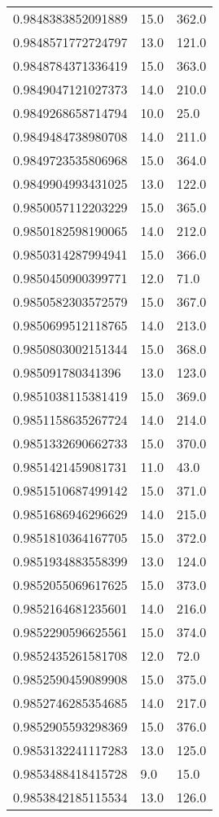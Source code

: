 \begin{center}
\begin{supertabular}[H]{p{0.30\textwidth}p{0.05\textwidth}p{0.05\textwidth}}
0.9848383852091889 & 15.0 & 362.0 \\ 
0.9848571772724797 & 13.0 & 121.0 \\ 
0.9848784371336419 & 15.0 & 363.0 \\ 
0.9849047121027373 & 14.0 & 210.0 \\ 
0.9849268658714794 & 10.0 & 25.0 \\ 
0.9849484738980708 & 14.0 & 211.0 \\ 
0.9849723535806968 & 15.0 & 364.0 \\ 
0.9849904993431025 & 13.0 & 122.0 \\ 
0.9850057112203229 & 15.0 & 365.0 \\ 
0.9850182598190065 & 14.0 & 212.0 \\ 
0.9850314287994941 & 15.0 & 366.0 \\ 
0.9850450900399771 & 12.0 & 71.0 \\ 
0.9850582303572579 & 15.0 & 367.0 \\ 
0.9850699512118765 & 14.0 & 213.0 \\ 
0.9850803002151344 & 15.0 & 368.0 \\ 
0.985091780341396 & 13.0 & 123.0 \\ 
0.9851038115381419 & 15.0 & 369.0 \\ 
0.9851158635267724 & 14.0 & 214.0 \\ 
0.9851332690662733 & 15.0 & 370.0 \\ 
0.9851421459081731 & 11.0 & 43.0 \\ 
0.9851510687499142 & 15.0 & 371.0 \\ 
0.9851686946296629 & 14.0 & 215.0 \\ 
0.9851810364167705 & 15.0 & 372.0 \\ 
0.9851934883558399 & 13.0 & 124.0 \\ 
0.9852055069617625 & 15.0 & 373.0 \\ 
0.9852164681235601 & 14.0 & 216.0 \\ 
0.9852290596625561 & 15.0 & 374.0 \\ 
0.9852435261581708 & 12.0 & 72.0 \\ 
0.9852590459089908 & 15.0 & 375.0 \\ 
0.9852746285354685 & 14.0 & 217.0 \\ 
0.9852905593298369 & 15.0 & 376.0 \\ 
0.9853132241117283 & 13.0 & 125.0 \\ 
0.9853488418415728 & 9.0 & 15.0 \\ 
0.9853842185115534 & 13.0 & 126.0 \\ 

\end{supertabular}
\end{center}
